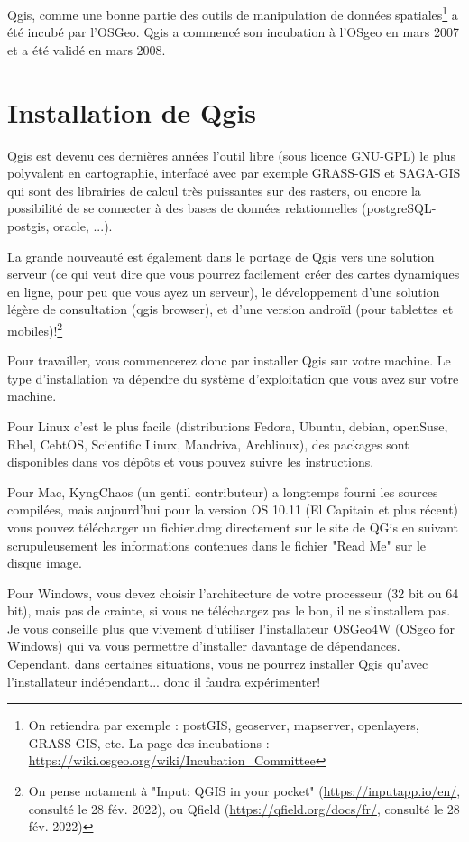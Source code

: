 \documentclass[a4paper, 11pt]{article}
\begin{document}
  Qgis, comme une bonne partie des outils de manipulation de données spatiales\footnote{On retiendra par exemple : postGIS, geoserver, mapserver, openlayers, GRASS-GIS, etc. La page des incubations : \url{https://wiki.osgeo.org/wiki/Incubation_Committee}} a été incubé par l'OSGeo. Qgis a commencé son incubation à l'OSgeo en mars 2007 et a été validé en mars 2008.

\section{Installation de Qgis}
  Qgis est devenu ces dernières années l'outil libre (sous licence GNU-GPL) le plus polyvalent en cartographie, interfacé avec par exemple GRASS-GIS et SAGA-GIS qui sont des librairies de calcul très puissantes sur des rasters, ou encore la possibilité de se connecter à des bases de données relationnelles (postgreSQL-postgis, oracle, ...).

  La grande nouveauté est également dans le portage de Qgis vers une solution serveur (ce qui veut dire que vous pourrez facilement créer des cartes dynamiques en ligne, pour peu que vous ayez un serveur), le développement d'une solution légère de consultation (qgis browser), et d'une version androïd (pour tablettes et mobiles)!\footnote{On pense notament à "Input: QGIS in your pocket" (\url{https://inputapp.io/en/}, consulté le 28 fév. 2022), ou Qfield (\url{https://qfield.org/docs/fr/}, consulté le 28 fév. 2022)}

  Pour travailler, vous commencerez donc par installer Qgis sur votre machine. Le type d'installation va dépendre du système d'exploitation que vous avez sur votre machine.

  Pour Linux c'est le plus facile (distributions Fedora, Ubuntu, debian, openSuse, Rhel, CebtOS, Scientific Linux, Mandriva, Archlinux), des packages sont disponibles dans vos dépôts et vous pouvez suivre les instructions.

  Pour Mac, KyngChaos (un gentil contributeur) a longtemps fourni les sources compilées, mais aujourd'hui pour la version OS 10.11 (El Capitain et plus récent) vous pouvez télécharger un fichier.dmg directement sur le site de QGis en suivant scrupuleusement les informations contenues dans le fichier "Read Me" sur le disque image.

  Pour Windows, vous devez choisir l'architecture de votre processeur (32 bit ou 64 bit), mais pas de crainte, si vous ne téléchargez pas le bon, il ne s'installera pas. Je vous conseille plus que vivement d'utiliser l'installateur OSGeo4W (OSgeo for Windows) qui va vous permettre d'installer davantage de dépendances. Cependant, dans certaines situations, vous ne pourrez installer Qgis qu'avec l'installateur indépendant... donc il faudra expérimenter!
\end{document}
